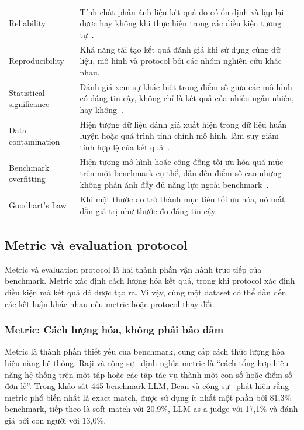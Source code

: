 \begin{longtable}{p{4cm} p{12cm}}
Reliability &
Tính chất phản ánh liệu kết quả đo có ổn định và lặp lại được hay không khi thực hiện trong các điều kiện tương tự~\cite{everything_benchmark}. \\
\addlinespace

Reproducibility &
Khả năng tái tạo kết quả đánh giá khi sử dụng cùng dữ liệu, mô hình và protocol bởi các nhóm nghiên cứu khác nhau. \\
\addlinespace

Statistical significance &
Đánh giá xem sự khác biệt trong điểm số giữa các mô hình có đáng tin cậy, không chỉ là kết quả của nhiễu ngẫu nhiên, hay không~\cite{measuring_what_matters}. \\
\addlinespace

Data contamination &
Hiện tượng dữ liệu đánh giá xuất hiện trong dữ liệu huấn luyện hoặc quá trình tinh chỉnh mô hình, làm suy giảm tính hợp lệ của kết quả~\cite{measuring_what_matters}. \\
\addlinespace

Benchmark overfitting &
Hiện tượng mô hình hoặc cộng đồng tối ưu hóa quá mức trên một benchmark cụ thể, dẫn đến điểm số cao nhưng không phản ánh đầy đủ năng lực ngoài benchmark~\cite{everything_benchmark, measuring_what_matters}. \\
\addlinespace

Goodhart's Law &
Khi một thước đo trở thành mục tiêu tối ưu hóa, nó mất dần giá trị như thước đo đáng tin cậy. \\
\bottomrule
\end{longtable}

\normalsize

\subsection{Metric và evaluation protocol}
\label{sec:metric_protocol}

Metric và evaluation protocol là hai thành phần vận hành trực tiếp của benchmark. Metric xác định cách lượng hóa kết quả, trong khi protocol xác định điều kiện mà kết quả đó được tạo ra. Vì vậy, cùng một dataset có thể dẫn đến các kết luận khác nhau nếu metric hoặc protocol thay đổi.

\subsubsection{Metric: Cách lượng hóa, không phải bảo đảm}
\label{sec:metric}

Metric là thành phần thiết yếu của benchmark, cung cấp cách thức lượng hóa hiệu năng hệ thống. Raji và cộng sự~\cite{everything_benchmark} định nghĩa metric là ``cách tổng hợp hiệu năng hệ thống trên một tập hoặc các tập tác vụ thành một con số hoặc điểm số đơn lẻ''. Trong khảo sát 445 benchmark LLM, Bean và cộng sự~\cite{measuring_what_matters} phát hiện rằng metric phổ biến nhất là exact match, được sử dụng ít nhất một phần bởi 81,3\% benchmark, tiếp theo là soft match với 20,9\%, LLM-as-a-judge với 17,1\% và đánh giá bởi con người với 13,0\%.

